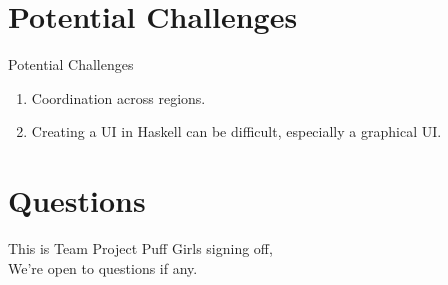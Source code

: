 \documentclass{beamer}
\begin{document}
\section{Potential Challenges}
\begin{frame}{Potential Challenges}
    \begin{enumerate}
        \item Coordination across regions.
        \item Creating a UI in Haskell can be difficult, especially a graphical UI.
    \end{enumerate}
    \end{frame}

\section{Questions}
\begin{frame}{ }
    \begin{center}
        \LARGE
   This is Team Project Puff Girls signing off, \\ 
   We're open to questions if any.
    \end{center}
\end{frame}
\end{document}
